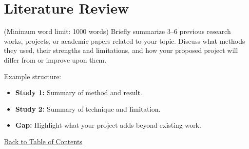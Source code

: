 \section{Literature Review}
(Minimum word limit: 1000 words)
Briefly summarize 3–6 previous research works, projects, or academic papers related to your topic.  
Discuss what methods they used, their strengths and limitations, and how your proposed project will differ from or improve upon them.

Example structure:
\begin{itemize}
    \item \textbf{Study 1:} Summary of method and result.
    \item \textbf{Study 2:} Summary of technique and limitation.
    \item \textbf{Gap:} Highlight what your project adds beyond existing work.
\end{itemize}

\hyperref[contents]{\small Back to Table of Contents}
\newpage
